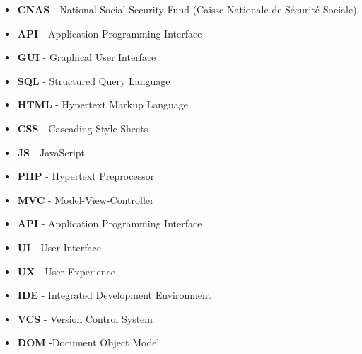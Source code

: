 \documentclass[12pt]{report}
\begin{document}
\begin{itemize}
    \item \textbf{CNAS} - National Social Security Fund (Caisse Nationale de Sécurité Sociale)
    \item \textbf{API} - Application Programming Interface
    \item \textbf{GUI} - Graphical User Interface
    \item \textbf{SQL} - Structured Query Language
    \item \textbf{HTML} - Hypertext Markup Language
    \item \textbf{CSS} - Cascading Style Sheets
    \item \textbf{JS} - JavaScript
    \item \textbf{PHP} - Hypertext Preprocessor
    \item \textbf{MVC} - Model-View-Controller
    \item \textbf{API} - Application Programming Interface
    \item \textbf{UI} - User Interface
    \item \textbf{UX} - User Experience
    \item \textbf{IDE} - Integrated Development Environment
    \item \textbf{VCS} - Version Control System
    \item \textbf{DOM} -Document Object Model
\end{itemize}










 
\end{document}
